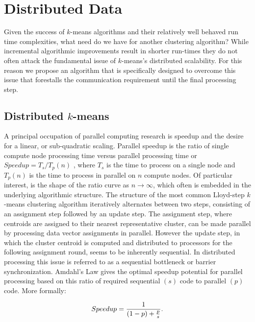 \section{Distributed Data}
Given the success of $k$-means algorithms and their relatively well behaved run time complexities, what need do we have
for another clustering algorithm?  While incremental algorithmic improvements result in shorter run-times they do not
often attack the fundamental issue of $k$-means's distributed scalability.  For this reason we propose an algorithm
that is specifically designed to overcome this issue that forestalls the communication requirement until the final
processing step.

\subsection{Distributed $k$-means}
A principal occupation of parallel computing research is speedup and the desire for a linear, or sub-quadratic
scaling.  Parallel speedup is the ratio of single compute node processing time versus parallel processing time or
$Speedup = T_s/T_p(n)$ , where $T_s$ is the time to process on a single node and $T_p(n)$ is the time to process in
parallel on $n$ compute nodes.  Of particular interest, is the shape of the ratio curve as $n\rightarrow \infty$, which
often is embedded in the underlying algorithmic structure.  The structure of the most common Lloyd-step $k$-means
clustering algorithm iteratively alternates between two steps, consisting of an assignment step followed by an update
step.  The assignment step, where centroids are assigned to their nearest representative cluster, can be made parallel by
processing data vector assignments in parallel.  However the update step, in which the cluster centroid is computed and
distributed to processors for the following assignment round, seems to be inherently sequential.  In distributed processing 
this issue is referred to as a sequential bottleneck or barrier synchronization.  Amdahl's Law gives the optimal speedup 
potential for parallel processing based on this ratio of required sequential $(s)$ code to parallel $(p)$ code.  More formally:
\begin{Theorem}
$$Speedup = {{1}\over{ (1-p)+{{p}\over{s}}}}.$$
\end{Theorem}

